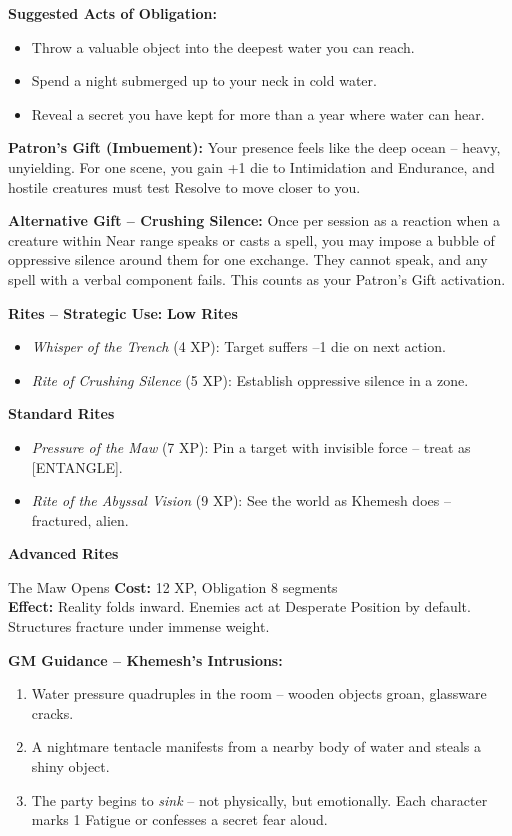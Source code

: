 \documentclass[10pt,a5paper]{book}
\begin{document}
\textbf{Suggested Acts of Obligation:}
\begin{itemize}
    \item Throw a valuable object into the deepest water you can reach.
    \item Spend a night submerged up to your neck in cold water.
    \item Reveal a secret you have kept for more than a year where water can hear.
\end{itemize}

\textbf{Patron's Gift (Imbuement):} Your presence feels like the deep ocean -- heavy, unyielding. For one scene, you gain +1 die to Intimidation and Endurance, and hostile creatures must test Resolve to move closer to you.

\textbf{Alternative Gift -- Crushing Silence:} Once per session as a reaction when a creature within Near range speaks or casts a spell, you may impose a bubble of oppressive silence around them for one exchange. They cannot speak, and any spell with a verbal component fails. This counts as your Patron's Gift activation.

\textbf{Rites -- Strategic Use:}
\textbf{Low Rites}
\begin{itemize}
    \item \textit{Whisper of the Trench} (4 XP): Target suffers --1 die on next action.
    \item \textit{Rite of Crushing Silence} (5 XP): Establish oppressive silence in a zone.
\end{itemize}
\textbf{Standard Rites}
\begin{itemize}
    \item \textit{Pressure of the Maw} (7 XP): Pin a target with invisible force -- treat as [ENTANGLE].
    \item \textit{Rite of the Abyssal Vision} (9 XP): See the world as Khemesh does -- fractured, alien.
\end{itemize}
\textbf{Advanced Rites}
\begin{patronbox}{The Maw Opens}
\textbf{Cost:} 12 XP, Obligation 8 segments \\
\textbf{Effect:} Reality folds inward. Enemies act at Desperate Position by default. Structures fracture under immense weight.
\end{patronbox}

\textbf{GM Guidance -- Khemesh's Intrusions:}
\begin{enumerate}
    \item Water pressure quadruples in the room -- wooden objects groan, glassware cracks.
    \item A nightmare tentacle manifests from a nearby body of water and steals a shiny object.
    \item The party begins to \textit{sink} -- not physically, but emotionally. Each character marks 1 Fatigue or confesses a secret fear aloud.
\end{enumerate}
\end{document}
